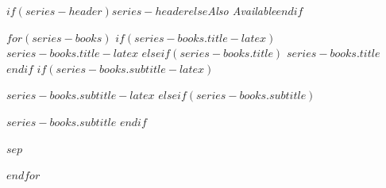 \pagestyle{empty}

\begin{center}

\textit{$if(series-header)$$series-header$$else$Also Available$endif$}

\vspace{1cm}

$for(series-books)$
$if(series-books.title-latex)$
\textbf{\textsc{$series-books.title-latex$}}
$elseif(series-books.title)$
\textbf{\textsc{$series-books.title$}}
$endif$
$if(series-books.subtitle-latex)$
\par $series-books.subtitle-latex$
$elseif(series-books.subtitle)$
\par $series-books.subtitle$
$endif$
\par
$sep$
\vspace{1cm}

$endfor$
\end{center}
